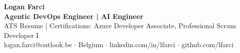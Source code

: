 \documentclass[10pt,a4paper]{article}
\begin{document}

{\LARGE\textbf{Logan Farci}}\\
\textbf{Agentic DevOps Engineer | AI Engineer}\\
ATS Resume | Certifications: Azure Developer Associate, Professional Scrum Developer I\\[-1pt]
logan.farci@outlook.be $\cdot$ Belgium $\cdot$ linkedin.com/in/lfarci $\cdot$ github.com/lfarci






\end{document}
